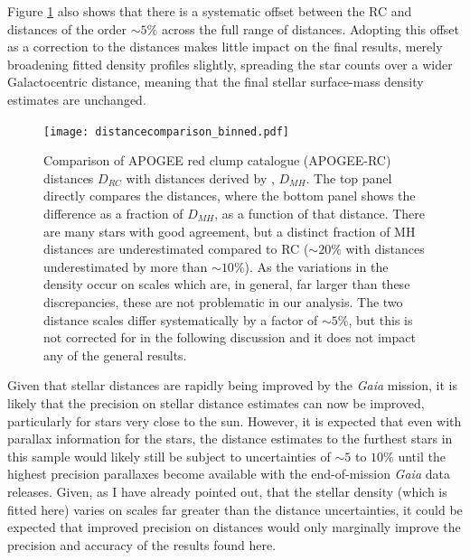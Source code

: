  Figure \ref{fig:distcomp} also shows that there is a systematic offset between the RC and \citet{2014AJ....147..116H} distances of the order $\sim 5\%$ across the full range of distances. Adopting this offset as a correction to the distances makes little impact on the final results, merely broadening fitted density profiles slightly, spreading the star counts over a wider Galactocentric distance, meaning that the final stellar surface-mass density estimates are unchanged.

\begin{figure}
 	\texttt{[image: distancecomparison\_binned.pdf]}
    \caption[Comparison of APOGEE RC catalogue distances with distances derived by \citet{2015ApJ...808..132H}, as used in Chapter \ref{chapter:apogeestruc}]{Comparison of APOGEE red clump catalogue (APOGEE-RC) distances $D_{RC}$ with distances derived by \citet{2015ApJ...808..132H}, $D_{MH}$. The top panel directly compares the distances, where the bottom panel shows the difference as a fraction of $D_{MH}$, as a function of that distance.  There are many stars with good agreement, but a distinct fraction of MH distances are underestimated compared to RC ($\sim 20\%$ with distances underestimated by more than $\sim 10\%$). As the variations in the density occur on scales which are, in general, far larger than these discrepancies, these are not problematic in our analysis. The two distance scales differ systematically by a factor of $\sim 5\%$, but this is not corrected for in the following discussion and it does not impact any of the general results.}
    \label{fig:distcomp}
 \end{figure}

Given that stellar distances are rapidly being improved by the \emph{Gaia} mission, it is likely that the precision on stellar distance estimates can now be improved, particularly for stars very close to the sun. However, it is expected that even with parallax information for the stars, the distance estimates to the furthest stars in this sample would likely still be subject to uncertainties of $\sim 5$ to $10\%$ until the highest precision parallaxes become available with the end-of-mission \emph{Gaia} data releases. Given, as I have already pointed out, that the stellar density (which is fitted here) varies on scales far greater than the distance uncertainties, it could be expected that improved precision on distances would only marginally improve the precision and accuracy of the results found here.

